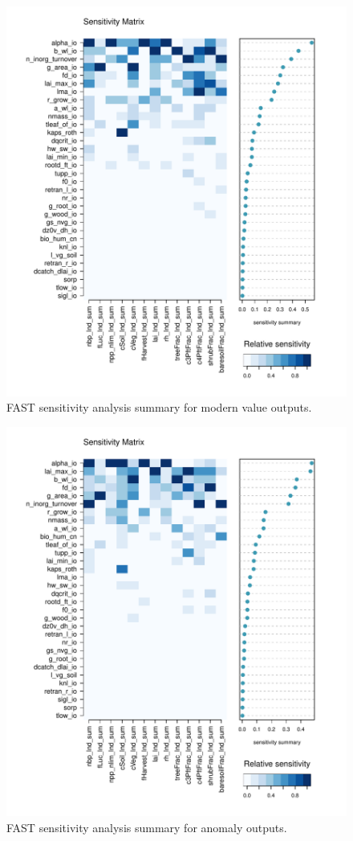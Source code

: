 \documentclass[gmd, manuscript]{copernicus}
\begin{document}
\begin{figure}[ht]
\includegraphics[width=12cm]{./figs/figA09.pdf}
\caption{FAST sensitivity analysis summary for modern value outputs.}
\label{fig:FAST_sensmat_Y_level1a}
\end{figure}

\begin{figure}[ht]
\includegraphics[width=12cm]{./figs/figA10.pdf}
\caption{FAST sensitivity analysis summary for anomaly outputs.}
\label{fig:FAST_sensmat_YAnom_level1a}
\end{figure}
\end{document}
